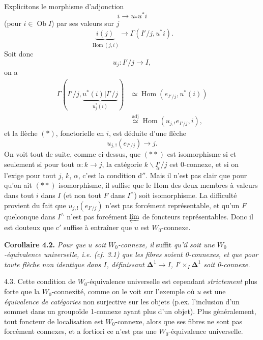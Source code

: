 \documentclass[11pt]{article}
\newcommand{\printedpage}[1]{\marginpar{\footnotesize p.~#1}}
\newcommand{\msp}[1]{\marginpar{\footnotesize [#1]}}
\newcommand{\Hom}{\operatorname{Hom}}
\newcommand{\Ob}{\operatorname{Ob}}
\newcommand{\bDelta}{\boldsymbol{\Delta}}
\begin{document}
\msp{page 55}Explicitons le morphisme d'adjonction
\[
i \longrightarrow u_*u^*i
\]
(pour $i \in \Ob I$) par ses valeurs sur $j$
\[
\underbrace{i(j)}_{\Hom(j,i)} \longrightarrow \Gamma(I'/j, u^*i). \tag*{$(\ast)$}
\]
Soit donc
\[
u_j : I'/j \longrightarrow I,
\]
\printedpage{35}
on a
\[
\begin{aligned}
\Gamma(I'/j, \underbrace{u^*(i)|I'/j}_{u_j^*(i)}) &\simeq \Hom(e_{I'/j}, u^*(i)) \\ %
&\overset{\mathrm{adj}}{\simeq} \Hom(u_{j,!}e_{I'/j}, i),
\end{aligned}
\]
et la flèche $(\ast)$, fonctorielle en $i$, est déduite d'une flèche
\[
u_{j,!}(e_{I'/j}) \longrightarrow j. \tag*{$(\ast\ast)$}
\]
On voit tout de suite, comme ci-dessus, que $(\ast\ast)$ est isomorphisme si et seulement si pour tout $\alpha : k \longrightarrow j$, la catégorie $k\backslash\underset{\alpha}{I'}/j$ est 0-connexe, et si on l'exige pour tout $j$, $k$, $\alpha$, c'est la condition d$''$. Mais il n'est pas clair que pour qu'on ait $(\ast\ast)$ isomorphisme, il suffise que le Hom des deux membres à valeurs dans tout $i$ dans $I$ (et non tout $F$ dans $I^{\wedge}$) soit isomorphisme. La difficulté provient du fait que $u_{j,!}(e_{I'/j})$ n'est pas forcément représentable, et qu'un $F$ quelconque dans $I^{\wedge}$ \msp{page 56}n'est pas forcément $\varprojlim$ de foncteurs représentables. Donc il est douteux que c$'$ suffise à entraîner que $u$ est $W_0$-connexe.

\textbf{Corollaire 4.2.} \textit{Pour que $u$ soit $W_0$-connexe, il} suffit \textit{qu'il soit une $W_0$-équivalence universelle, i.e. (cf. 3.1) que les fibres soient \textup{0}-connexes, et que pour toute flèche non identique dans $I$, définissant $\bDelta^1 \longrightarrow I$, $I' \times_I \bDelta^1$ soit \textup{0}-connexe.}

4.3. Cette condition de $W_0$-équivalence universelle est cependant \textit{strictement} plus forte que la $W_0$-connexité, comme on le voit sur l'exemple où $u$ est une \textit{équivalence de catégories} non surjective sur les objets (p.ex. l'inclusion d'un sommet dans un groupoïde 1-connexe ayant plus d'un objet). Plus généralement, tout foncteur de localisation est $W_0$-connexe, alors que ses fibres ne sont pas forcément connexes, et a fortiori ce n'est pas une $W_0$-équivalence universelle.
\end{document}
